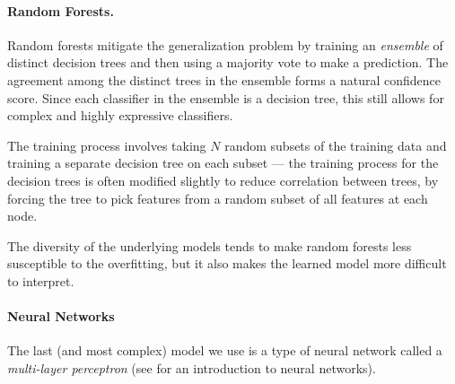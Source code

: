 %
%

\paragraph{Random Forests.} Random forests mitigate the generalization problem by training an {\em{ensemble}} of distinct decision trees and then using a majority vote to make a prediction. The agreement among the distinct trees in the ensemble forms a natural confidence score. Since each classifier in the ensemble is a decision tree, this still allows for complex and highly expressive classifiers.  

%
%
The training process involves taking $N$ random subsets of the training
data and training a separate decision tree on each subset --- the
training process for the decision trees is often modified slightly to
reduce correlation between trees, by forcing the tree to pick features
from a random subset of all features at each node.
%

The diversity of the underlying models tends to make random forests less
susceptible to the overfitting, but it
also makes the learned model more difficult to interpret. 
%


\paragraph{Neural Networks}
The last (and most complex) model we use is a type of neural network
called a \emph{multi-layer perceptron} (see \citealt{Nielsen2015-pu} for
an introduction to neural networks).

